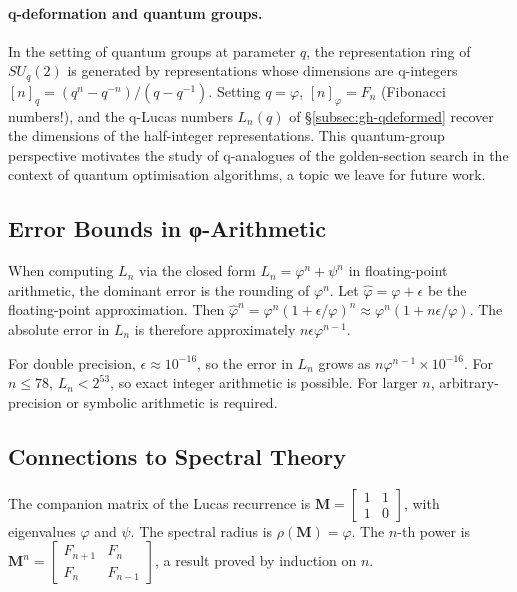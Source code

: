 \paragraph{q-deformation and quantum groups.}
In the setting of quantum groups at parameter \(q\),
the representation ring of \(SU_q(2)\) is generated by representations
whose dimensions are q-integers \([n]_q = (q^n - q^{-n})/(q - q^{-1})\).
Setting \(q = \varphi\), \([n]_\varphi = F_n\) (Fibonacci numbers!),
and the q-Lucas numbers \(L_n(q)\) of \S\ref{subsec:gh-qdeformed}
recover the dimensions of the half-integer representations.
This quantum-group perspective motivates the study of
q-analogues of the golden-section search in the context of
quantum optimisation algorithms, a topic we leave for future work.

\subsection{Error Bounds in φ-Arithmetic}
\label{subsec:gh-error-bounds}

When computing \(L_n\) via the closed form \(L_n = \varphi^n + \psi^n\)
in floating-point arithmetic, the dominant error is the rounding of
\(\varphi^n\).  Let \(\hat\varphi = \varphi + \epsilon\) be the
floating-point approximation.  Then
\(\hat\varphi^n = \varphi^n(1 + \epsilon/\varphi)^n
               \approx \varphi^n(1 + n\epsilon/\varphi)\).
The absolute error in \(L_n\) is therefore approximately
\(n\epsilon\varphi^{n-1}\).

For double precision, \(\epsilon \approx 10^{-16}\), so the error in
\(L_n\) grows as \(n\varphi^{n-1} \times 10^{-16}\).
For \(n \leq 78\), \(L_n < 2^{53}\), so exact integer arithmetic is
possible.  For larger \(n\), arbitrary-precision or symbolic arithmetic
is required.

\subsection{Connections to Spectral Theory}
\label{subsec:gh-spectral}

The companion matrix of the Lucas recurrence is
\(\mathbf{M} = \begin{bmatrix} 1 & 1 \\ 1 & 0 \end{bmatrix}\),
with eigenvalues \(\varphi\) and \(\psi\).
The spectral radius is \(\rho(\mathbf{M}) = \varphi\).
The \(n\)-th power is
\(\mathbf{M}^n = \begin{bmatrix} F_{n+1} & F_n \\ F_n & F_{n-1} \end{bmatrix}\),
a result proved by induction on \(n\).

